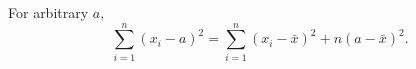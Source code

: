 \documentclass[11pt, oneside]{article}   	%
\begin{document}
%
%
%

\begin{lemma}
\label{lemma:meansum}
For arbitrary $a$,
$$ \sum_{i=1}^n (x_i - a)^2 = \sum_{i=1}^n (x_i - \bar{x})^2 + n(a-\bar{x})^2.$$
\end{lemma}
\end{document}

